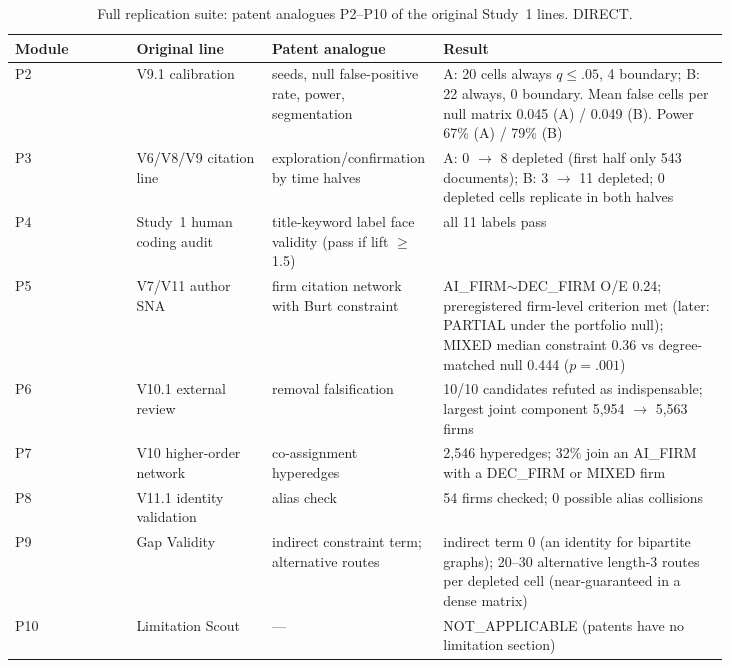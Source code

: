 \begin{table}[tbp]
  \centering
  \small
  \caption{Full replication suite: patent analogues P2--P10 of the original Study~1 lines. DIRECT.}
  \label{tab:suite}
  \setlength{\tabcolsep}{4pt}
  \begin{tabular}{l p{0.19\linewidth} p{0.24\linewidth} p{0.40\linewidth}}
    \toprule
    Module & Original line & Patent analogue & Result \\
    \midrule
    P2 & V9.1 calibration & seeds, null false-positive rate, power, segmentation & A: 20 cells always $q \le .05$, 4 boundary; B: 22 always, 0 boundary. Mean false cells per null matrix 0.045 (A) / 0.049 (B). Power 67\% (A) / 79\% (B) \\
    P3 & V6/V8/V9 citation line & exploration/confirmation by time halves & A: 0 $\rightarrow$ 8 depleted (first half only 543 documents); B: 3 $\rightarrow$ 11 depleted; 0 depleted cells replicate in both halves \\
    P4 & Study~1 human coding audit & title-keyword label face validity (pass if lift $\ge$ 1.5) & all 11 labels pass \\
    P5 & V7/V11 author SNA & firm citation network with Burt constraint & AI\_FIRM$\sim$DEC\_FIRM O/E 0.24; preregistered firm-level criterion met (later: PARTIAL under the portfolio null); MIXED median constraint 0.36 vs degree-matched null 0.444 ($p = .001$) \\
    P6 & V10.1 external review & removal falsification & 10/10 candidates refuted as indispensable; largest joint component 5,954 $\rightarrow$ 5,563 firms \\
    P7 & V10 higher-order network & co-assignment hyperedges & 2,546 hyperedges; 32\% join an AI\_FIRM with a DEC\_FIRM or MIXED firm \\
    P8 & V11.1 identity validation & alias check & 54 firms checked; 0 possible alias collisions \\
    P9 & Gap Validity & indirect constraint term; alternative routes & indirect term 0 (an identity for bipartite graphs); 20--30 alternative length-3 routes per depleted cell (near-guaranteed in a dense matrix) \\
    P10 & Limitation Scout & --- & NOT\_APPLICABLE (patents have no limitation section) \\
    \bottomrule
  \end{tabular}
\end{table}

